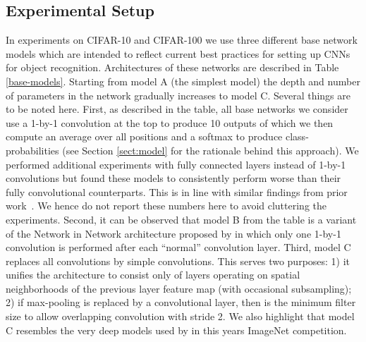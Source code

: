 \documentclass{article} \usepackage{iclr2015,times}
\begin{document}
\subsection{Experimental Setup}
\label{sect:setup}
In experiments on CIFAR-10 and CIFAR-100 we use three different base network models which are intended to
reflect current best practices for setting up CNNs for object
recognition. 
Architectures of these networks are described in Table
\ref{base-models}. Starting from model A (the simplest model) the depth and
number of parameters in the network gradually increases to model C. 
Several things are to be noted here. First, as described in the table,
all base networks we consider use a 1-by-1 convolution at the top to
produce 10 outputs of which we then compute an average over all
positions and a softmax to produce class-probabilities (see Section
\ref{sect:model} for the rationale behind this approach). We performed
additional experiments with fully connected layers instead of 
1-by-1 convolutions but found these models to consistently perform
 worse than their fully convolutional counterparts. This
is in line with similar findings from prior work~\citep{Lin_2014}. We
hence do not report these numbers here to avoid cluttering the
experiments. Second, it can be observed that model B from the table is
a variant of the Network in Network architecture proposed by \citet{Lin_2014} in which only one 1-by-1 convolution is
performed after each ``normal'' convolution layer. Third, model C
replaces all  convolutions by simple 
convolutions. This serves two purposes: 1) it unifies the
architecture to consist only of layers operating on  spatial
neighborhoods of the previous layer feature map (with occasional
subsampling); 2) if max-pooling is replaced by a
convolutional layer, then  is the minimum filter size to allow overlapping convolution with stride 2. 
We also highlight that model C resembles the very deep
models used by \citet{VGG_2014} in this years ImageNet
competition.
\end{document}

